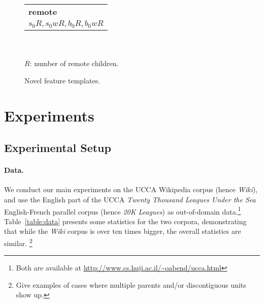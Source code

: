 \documentclass[11pt]{article}
\newcommand{\oa}[1]{\footnote{\color{red} #1}}
\newcommand{\tabref}[1]{Table~\ref{#1}}
\begin{document}
\begin{figure}
\begin{tabular}{l}
\textbf{remote} \\
$s_0R, s_0wR, b_0R, b_0wR$
\end{tabular}\\\\
\footnotesize
$R$: number of remote children.
\caption{Novel feature templates.\label{fig:new_features}}
\end{figure}


\section{Experiments}

\subsection{Experimental Setup}

\paragraph{Data.}\label{sec:data}
We conduct our main experiments on the UCCA Wikipedia corpus (hence \textit{Wiki}), and use
the English part of the
UCCA \textit{Twenty Thousand Leagues Under the Sea} English-French parallel corpus (hence \textit{20K Leagues}) as
out-of-domain data.\footnote{Both are available at \url{http://www.cs.huji.ac.il/~oabend/ucca.html}}
\tabref{table:data} presents some statistics for the two corpora, demonstrating that while
the \textit{Wiki} corpus is over ten times bigger, the overall statistics are
similar. \oa{Give examples of cases where multiple parents and/or discontiguous units show up.}
\end{document}
